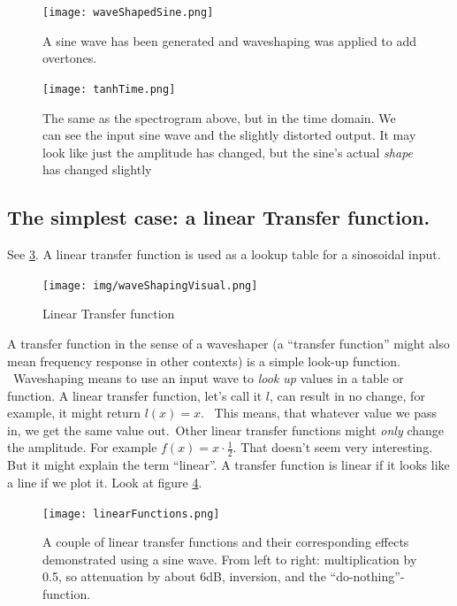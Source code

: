 \begin{figure}[h!]
	\centering
	\texttt{[image: waveShapedSine.png]}
	\caption[Wave shaped sine oscillator]
	{A sine wave has been generated and waveshaping was applied to add overtones.}
	\label{fig:waveshapedSIne}
\end{figure}


\begin{figure}[h!]
	\centering
	\texttt{[image: tanhTime.png]}
	\caption[Distorted sine, time domain]
	{The same as the spectrogram above, but in the time domain. We can see the input sine wave and the slightly distorted output. It may look like just the amplitude has changed, but the sine's actual \textit{shape} has changed slightly}
	\label{fig:tanhTimeDom}
\end{figure}

\subsection{The simplest case: a linear Transfer function. } %
\label{sub:linearTrans}
See \ref{fig:linfunct}. A linear transfer function is used as a lookup table for a sinosoidal input.

\begin{figure}[H]
	\begin{center}
		\texttt{[image: img/waveShapingVisual.png]}
		\caption{Linear Transfer function}
		\label{fig:linfunct}
	\end{center}
\end{figure}
A transfer function in the sense of a waveshaper (a ``transfer function'' might also mean frequency response in other contexts) is a simple look-up function. \
Waveshaping means to use an input wave to \textit{look up} values in a table or function. A linear transfer function, let's call it $l$, can result in no change, for example, it might return $l(x)=x$. \
This means, that whatever value we pass in, we get the same value out.\
Other linear transfer functions might \textit{only} change the amplitude. For example $f(x)=x \cdot \frac{1}{2}$. That doesn't seem very interesting. But it might explain the term ``linear''. A transfer function is linear if it looks like a line if we plot it. Look at figure \ref{fig:linears}.

\begin{figure}[h!]
	\centering
	\texttt{[image: linearFunctions.png]}
	\caption[Linear Transfer functions]
	{A couple of linear transfer functions and their corresponding effects demonstrated using a sine wave. From left to right: multiplication by 0.5, so attenuation by about 6dB, inversion, and the ``do-nothing''-function.}
	\label{fig:linears}
\end{figure}


